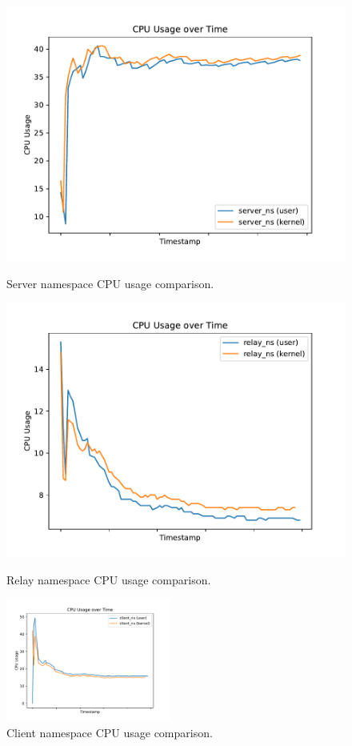 \begin{figure}[!htb]
    \begin{minipage}{0.48\textwidth}
        \centering
        \includegraphics[width=1\linewidth]{figures/04_testing_and_results/cpu_usage_server_ns.pdf}
        \caption{Server namespace CPU usage comparison.}\label{fig:cpu-utilization-server}
    \end{minipage}\hfill
    \begin{minipage}{0.48\textwidth}
        \centering
        \includegraphics[width=1\linewidth]{figures/04_testing_and_results/cpu_usage_relay_ns.pdf}
        \caption{Relay namespace CPU usage comparison.}\label{fig:cpu-utilization-relay}
    \end{minipage}\hfill
    \begin{minipage}{\textwidth}
        \centering
        \includegraphics[width=0.48\textwidth]{figures/04_testing_and_results/cpu_usage_client_ns.pdf}
        \caption{Client namespace CPU usage comparison.}\label{fig:cpu-utilization-client}
    \end{minipage}
\end{figure}